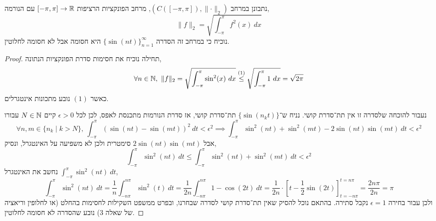 \question{}
נתבונן במרחב $(C([-\pi, \pi]), \lVert \cdot \rVert_2)$, מרחב הפונקציות הרציפות $[-\pi, \pi] \to \mathbb{R}$ עם הנורמה,
\[
	\lVert f \rVert_2
	= \sqrt{\int_{-\pi}^{\pi} f^2(x)\ dx}
\]
נוכיח כי במרחב זה הסדרה ${\{ \sin(nt) \}}_{n = 1}^\infty$ היא חסומה אבל לא חסומה לחלוטין.
\begin{proof}
	תחילה נוכיח את חסימות סדרת הפונקציות הנתונה,
	\[
		\forall n \in \NN,\ 
		\lVert f \rVert_2
		= \sqrt{\int_{-\pi}^{\pi} \sin^2(x)\ dx}
		\overset{(1)}{\le} \sqrt{\int_{-\pi}^{\pi} 1\ dx}
		= \sqrt{2\pi}
	\]
	כאשר $(1)$ נובע מתכונות אינטגרלים.

	נעבור להוכחה שלסדרה זו אין תת־סדרת קושי.
	נניח ש־$\{ \sin(n_k t) \}$ תת־סדרת קושי, אז סדרת הנורמות מתכנסת לאפס, לכן לכל $\epsilon > 0$ קיים $N \in \mathbb{N}$ עבורו
	\[
		\forall n, m \in \{ n_k \mid k > N \},\ \int_{-\pi}^{\pi} {(\sin(nt) - \sin(mt))}^2\ dt < \epsilon^2
		\implies \int_{-\pi}^{\pi} \sin^2(nt) + \sin^2(mt) - 2\sin(nt)\sin(mt)\ dt < \epsilon^2
	\]
	אבל $2\sin(nt)\sin(mt)$ סימטרית ולכן לא משפיעה על האינטגרל, ונסיק,
	\[
		\int_{-\pi}^{\pi} \sin^2(nt)\ dt
		\le \int_{-\pi}^{\pi} \sin^2(nt) + \sin^2(mt)\ dt < \epsilon^2
	\]
	נחשב את האינטגרל $\int_{-\pi}^{\pi} \sin^2(nt)\ dt$,
	\[
		\int_{-\pi}^{\pi} \sin^2(nt)\ dt
		= \frac{1}{n} \int_{-n\pi}^{n\pi} \sin^2(t)\ dt
		= \frac{1}{2n} \int_{-n\pi}^{n\pi} 1 - \cos(2t)\ dt
		= \frac{1}{2n} \cdot {\left[ t - \frac{1}{2} \sin(2t) \right]}_{t = -n\pi}^{t = n\pi}
		= \frac{2n\pi}{2n}
		= \pi
	\]
	ולכן עבור בחירה $\epsilon = 1$ נקבל סתירה.
	בהתאם נוכל להסיק שאין תת־סדרת קושי לסדרה שבחרנו, ובפרט ממשפט השקילות לחסימות בהחלט (או לחלופין וריאציה של שאלה 3) נובע שהסדרה לא חסומה לחלוטין.
\end{proof}


